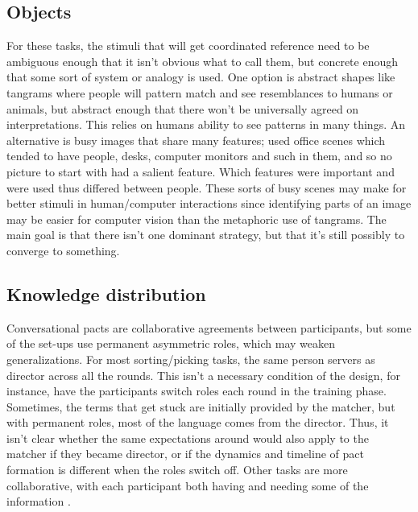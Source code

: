 \documentclass[11pt]{article}
\begin{document}
	
	\subsection{Objects}
	For these tasks, the stimuli that will get coordinated reference need to be ambiguous enough that it isn't obvious what to call them, but concrete enough that some sort of system or analogy is used. One option is abstract shapes like tangrams where people will pattern match and see resemblances to humans or animals, but abstract enough that there won't be universally agreed on interpretations. This relies on humans ability to see patterns in many things.  An alternative is busy images that share many features; \cite{weberCulturalConflictMerger2003} used office scenes which tended to have people, desks, computer monitors and such in them, and so no picture to start with had a salient feature. Which features were important and were used thus differed between people. These sorts of busy scenes may make for better stimuli in human/computer interactions since identifying parts of an image may be easier for computer vision than the metaphoric use of tangrams.	The main goal is that there isn't one dominant strategy, but that it's still possibly to converge to something.
	
	\subsection{Knowledge distribution} 
	Conversational pacts are collaborative agreements between participants, but some of the set-ups use permanent asymmetric roles, which may weaken generalizations. For most sorting/picking tasks, the same person servers as director across all the rounds. This isn't a necessary condition of the design, for instance, \cite{weberCulturalConflictMerger2003} have the participants switch roles each round in the training phase. Sometimes, the terms that get stuck are initially provided by the matcher, but with permanent roles, most of the language comes from the director. 
	Thus, it isn't clear whether the same expectations around would also apply to the matcher if they became director, or if the dynamics and timeline of pact formation is different when the roles switch off. 
	Other tasks are more collaborative, with each participant both having and needing some of the information \cite{ibarraFlexibilityConceptualPacts2016, garrodConversationCoordinationConvention1994}. 
	
\end{document}
